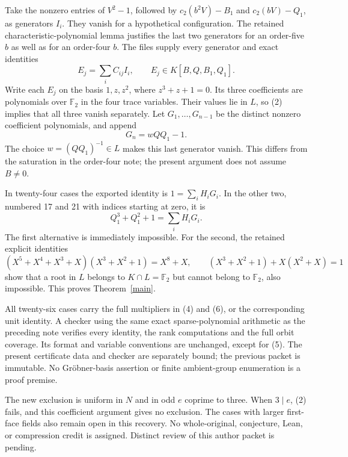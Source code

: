 \documentclass[11pt,a4paper]{article}
\newcommand{\F}{\mathbb F}
\begin{document}
Take the nonzero entries of $V^2-1$, followed by
$c_2(b^2V)-B_1$ and $c_2(bV)-Q_1$, as generators $I_i$.
They vanish for a hypothetical configuration. The retained
characteristic-polynomial lemma justifies the last two generators
for an order-five $b$ as well as for an order-four $b$.
The files supply every generator and exact identities
\[
             E_j=\sum_i C_{ij}I_i,
           \qquad E_j\in K[B,Q,B_1,Q_1].              \tag{4}
\]
Write each $E_j$ on the basis $1,z,z^2$, where $z^3+z+1=0$.
Its three coefficients are polynomials over $\F_2$ in the four
trace variables. Their values lie in $L$, so (2) implies that all
three vanish separately. Let $G_1,\ldots,G_{n-1}$ be the distinct
nonzero coefficient polynomials, and append
\[
                         G_n=wQQ_1-1.                \tag{5}
\]
The choice $w=(QQ_1)^{-1}\in L$ makes this last generator vanish.
This differs from the saturation in the order-four note; the present
argument does not assume $B\ne0$.

In twenty-four cases the exported identity is
$1=\sum_i H_iG_i$. In the other two, numbered 17 and 21 with
indices starting at zero, it is
\[
                  Q_1^3+Q_1^2+1=\sum_i H_iG_i.       \tag{6}
\]
The first alternative is immediately impossible. For the second,
the retained explicit identities
\[
 (X^5+X^4+X^3+X)(X^3+X^2+1)=X^8+X,
 \qquad (X^3+X^2+1)+X(X^2+X)=1
\]
show that a root in $L$ belongs to $K\cap L=\F_2$ but cannot
belong to $\F_2$, also impossible. This proves Theorem~\ref{main}.

All twenty-six cases carry the full multipliers in (4) and (6),
or the corresponding unit identity. A checker using the same exact
sparse-polynomial arithmetic as the preceding note verifies every
identity, the rank computations and the full orbit coverage. Its
format and variable conventions are unchanged, except for (5).
The present certificate data and checker are separately bound; the
previous packet is immutable. No Gr\"obner-basis assertion or finite
ambient-group enumeration is a proof premise.

The new exclusion is uniform in $N$ and in odd $e$ coprime to three.
When $3\mid e$, (2) fails, and this coefficient argument gives no
exclusion. The cases with larger first-face fields also remain open
in this recovery. No whole-original, conjecture, Lean, or compression
credit is assigned. Distinct review of this author packet is pending.
\end{document}
